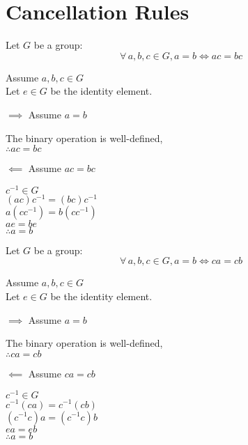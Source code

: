 \documentclass[letterpaper,12pt,fleqn]{article}
\begin{document}
\section*{Cancellation Rules}

\begin{theorem}
  Let $G$ be a group:
  \[\forall\,a,b,c\in G,a=b\iff ac=bc\]
\end{theorem}

\begin{theproof}
  Assume $a,b,c\in G$ \\
  Let $e\in G$ be the identity element.
  \begin{description}
  \item $\implies$ Assume $a=b$
    
    The binary operation is well-defined, \\
    $\therefore ac=bc$
    
  \item $\impliedby$ Assume $ac=bc$

    $c^{-1}\in G$ \\
    $(ac)c^{-1}=(bc)c^{-1}$ \\
    $a(cc^{-1})=b(cc^{-1})$ \\
    $ae=be$ \\
    $\therefore a=b$ \\
  \end{description}
\end{theproof}

\begin{theorem}
  Let $G$ be a group:
  \[\forall\,a,b,c\in G,a=b\iff ca=cb\]
\end{theorem}

\begin{theproof}
  Assume $a,b,c\in G$ \\
  Let $e\in G$ be the identity element.
  \begin{description}
  \item $\implies$ Assume $a=b$
    
    The binary operation is well-defined, \\
    $\therefore ca=cb$
    
  \item $\impliedby$ Assume $ca=cb$

    $c^{-1}\in G$ \\
    $c^{-1}(ca)=c^{-1}(cb)$ \\
    $(c^{-1}c)a=(c^{-1}c)b$ \\
    $ea=eb$ \\
    $\therefore a=b$ \\
  \end{description}
\end{theproof}
\end{document}
